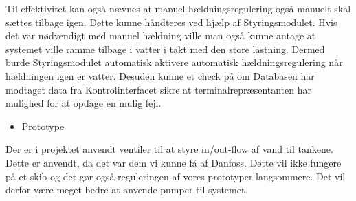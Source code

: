 Til effektivitet kan også nævnes at manuel hældningsregulering også manuelt skal sættes tilbage igen. Dette kunne håndteres ved hjælp af Styringsmodulet. Hvis det var nødvendigt med manuel hældning ville man også kunne antage at systemet ville ramme tilbage i vatter i takt med den store lastning. Dermed burde Styringsmodulet automatisk aktivere automatisk hældningsregulering når hældningen igen er vatter. Desuden kunne et check på om Databasen har modtaget data fra Kontrolinterfacet sikre at terminalrepræsentanten har mulighed for at opdage en mulig fejl.
\begin{large}\begin{itemize}
\item Prototype
\end{itemize}\end{large}
Der er i projektet anvendt ventiler til at styre in/out-flow af vand til tankene. Dette er anvendt, da det var dem vi kunne få af Danfoss. Dette vil ikke fungere på et skib og det gør også reguleringen af vores prototyper langsommere. Det vil derfor være meget bedre at anvende pumper til systemet.